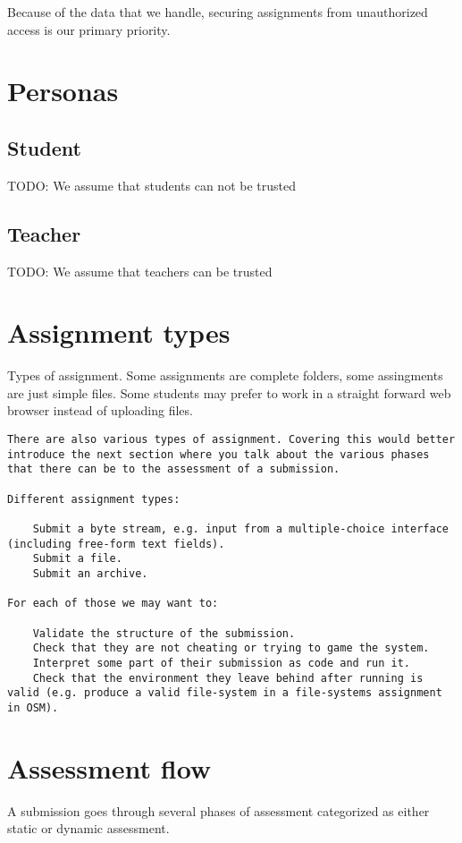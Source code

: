 Because of the data that we handle, securing assignments from
unauthorized access is our primary priority.

\section{Personas}
\subsection{Student}
TODO: We assume that students can not be trusted

\subsection{Teacher}
TODO: We assume that teachers can be trusted

\section{Assignment types}
Types of assignment. Some assignments are complete folders, some
assingments are just simple files. Some students may prefer to work in
a straight forward web browser instead of uploading files.


\begin{verbatim}
There are also various types of assignment. Covering this would better
introduce the next section where you talk about the various phases
that there can be to the assessment of a submission.

Different assignment types:

    Submit a byte stream, e.g. input from a multiple-choice interface (including free-form text fields).
    Submit a file.
    Submit an archive.

For each of those we may want to:

    Validate the structure of the submission.
    Check that they are not cheating or trying to game the system.
    Interpret some part of their submission as code and run it.
    Check that the environment they leave behind after running is valid (e.g. produce a valid file-system in a file-systems assignment in OSM).
\end{verbatim}



\section{Assessment flow}
A submission goes through several phases of assessment categorized as
either static or dynamic assessment.

